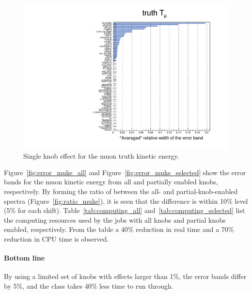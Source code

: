 \documentclass[12pt,a4paper,final]{iopart}
\begin{document}
\begin{figure}[h]
  \centering
  \includegraphics[angle=-90,origin=c, width=\textwidth]{figures/t_muke.pdf}
  \caption{Single knob effect for the muon truth kinetic energy.}
  \label{fig:true_mu_ke}
\end{figure}

Figure~\ref{fig:error_muke_all} and Figure~\ref{fig:error_muke_selected} show the error bands for the muon kinetic energy from all and partially enabled knobs, respectively. By forming the ratio of between the all- and partial-knob-enabled spectra (Figure~\ref{fig:ratio_muke}), it is seen that the difference is within 10\% level (5\% for each shift). Table~\ref{tab:computing_all} and~\ref{tab:computing_selected} list the computing resources used by the jobs with all knobs and partial knobs enabled, respectively. From the table a 40\% reduction in real time and a 70\% reduction in CPU time is observed.
\paragraph{Bottom line} By using a limited set of knobs with effects larger than 1\%, the error bands differ by 5\%, and the class takes 40\% less time to run through.
\end{document}
